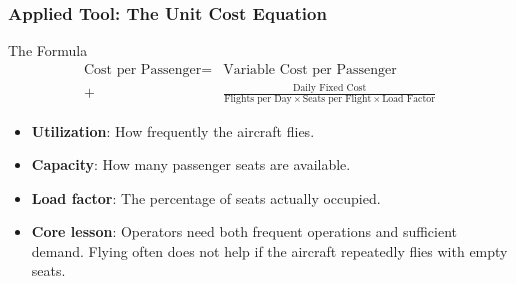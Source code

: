 \documentclass{beamer}
\begin{document}
\begin{frame}[t, shrink=10]
  \frametitle{Applied Tool: The Unit Cost Equation}
  \begin{block}{The Formula}
  \begin{align*}
         \text{Cost per Passenger}
    =& \text{Variable Cost per Passenger} \\
    +&\frac{\text{Daily Fixed Cost}}
    {\text{Flights per Day}\times\text{Seats per Flight}\times\text{Load Factor}}
  \end{align*}
  \end{block}
  \begin{itemize}
    \item \textbf{Utilization}: How frequently the aircraft flies.
    \item \textbf{Capacity}: How many passenger seats are available.
    \item \textbf{Load factor}: The percentage of seats actually occupied.
    \item \textbf{Core lesson}: Operators need both frequent operations and sufficient demand. Flying often does not help if the aircraft repeatedly flies with empty seats.
  \end{itemize}
\end{frame}
\end{document}
